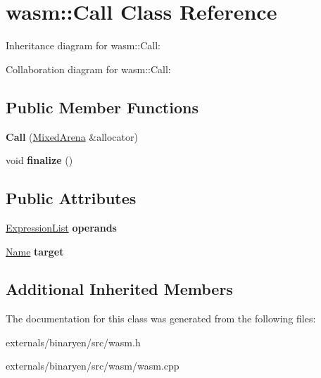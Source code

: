 \hypertarget{classwasm_1_1_call}{}\section{wasm\+:\+:Call Class Reference}
\label{classwasm_1_1_call}


Inheritance diagram for wasm\+:\+:Call\+:


Collaboration diagram for wasm\+:\+:Call\+:
\subsection*{Public Member Functions}
\begin{DoxyCompactItemize}
\item 
\mbox{\label{classwasm_1_1_call_a152c50991417e050afbc0dbc18d64567}} 
{\bfseries Call} (\mbox{\hyperlink{struct_mixed_arena}{Mixed\+Arena}} \&allocator)
\item 
\mbox{\label{classwasm_1_1_call_acf14b08dbcfa34ad31879aa0231f9b3d}} 
void {\bfseries finalize} ()
\end{DoxyCompactItemize}
\subsection*{Public Attributes}
\begin{DoxyCompactItemize}
\item 
\mbox{\label{classwasm_1_1_call_a12dd0230dbc9758a90ada4ff16dd8298}} 
\mbox{\hyperlink{class_arena_vector}{Expression\+List}} {\bfseries operands}
\item 
\mbox{\label{classwasm_1_1_call_adecb2807ac633a15d5fc130dd4b22507}} 
\mbox{\hyperlink{structwasm_1_1_name}{Name}} {\bfseries target}
\end{DoxyCompactItemize}
\subsection*{Additional Inherited Members}


The documentation for this class was generated from the following files\+:\begin{DoxyCompactItemize}
\item 
externals/binaryen/src/wasm.\+h\item 
externals/binaryen/src/wasm/wasm.\+cpp\end{DoxyCompactItemize}
